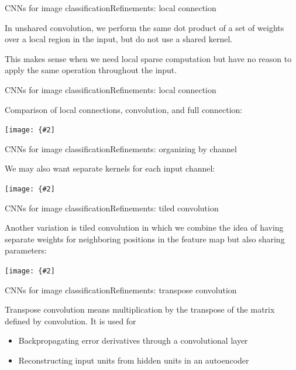 \documentclass{beamer}
\newcommand{\myfig}[3]{\centerline{\texttt{[image: \{\#2]}}}
\begin{document}
\begin{frame}{CNNs for image classification}{Refinements: local connection}

In \alert{unshared convolution}, we perform the same dot product of a
set of weights over a local region in the input, but do not use a shared
kernel.

\medskip

This makes sense when we need local sparse computation but have
no reason to apply the same operation throughout the input.

\end{frame}


\begin{frame}{CNNs for image classification}{Refinements: local connection}

Comparison of local connections, convolution, and full connection:

\myfig{2in}{goodfellow-fig9-14}{Goodfellow et al. (2016), Figure 9.14}

\end{frame}


\begin{frame}{CNNs for image classification}{Refinements: organizing by channel}

We may also want separate kernels for each input channel:

\myfig{1.8in}{goodfellow-fig9-15}{Goodfellow et al. (2016), Figure 9.15}

\end{frame}


\begin{frame}{CNNs for image classification}{Refinements: tiled convolution}

Another variation is \alert{tiled convolution} in which we combine
the idea of having separate weights for neighboring positions in the
feature map but also sharing parameters:

\myfig{1.6in}{goodfellow-fig9-16}{Goodfellow et al. (2016), Figure 9.16}

\end{frame}


\begin{frame}{CNNs for image classification}{Refinements: transpose convolution}

\alert{Transpose convolution} means multiplication by the transpose of the
matrix defined by convolution. It is used for
\begin{itemize}
\item Backpropagating error derivatives through a convolutional layer
\item Reconstructing input units from hidden units in an autoencoder
\end{itemize}

\end{frame}
\end{document}
